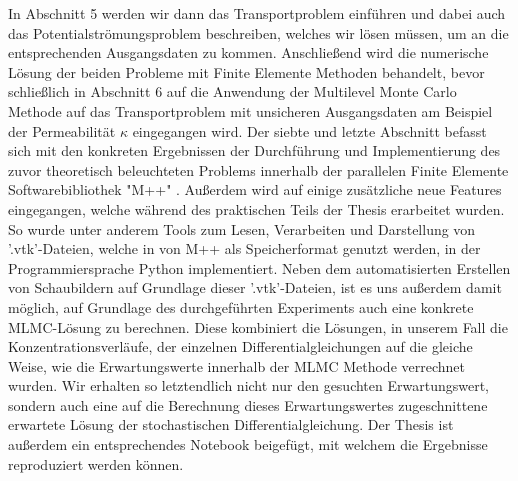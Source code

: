 In Abschnitt 5 werden wir dann das Transportproblem einführen und dabei auch das Potentialströmungsproblem beschreiben, welches wir lösen müssen, um an die entsprechenden Ausgangsdaten zu kommen. Anschließend wird die numerische Lösung der beiden Probleme mit Finite Elemente Methoden behandelt, bevor schließlich in Abschnitt 6 auf die Anwendung der Multilevel Monte Carlo Methode auf das Transportproblem mit unsicheren Ausgangsdaten am Beispiel der Permeabilität $\kappa$ eingegangen wird. 
Der siebte und letzte Abschnitt befasst sich mit den konkreten Ergebnissen der Durchführung und Implementierung des zuvor theoretisch beleuchteten Problems innerhalb der parallelen Finite Elemente Softwarebibliothek "M++" \cite{siteM++}. Außerdem wird auf einige zusätzliche neue Features eingegangen, welche während des praktischen Teils der Thesis erarbeitet wurden. So wurde unter anderem Tools zum Lesen, Verarbeiten und Darstellung von '.vtk'-Dateien, welche in von M++ als Speicherformat genutzt werden, in der Programmiersprache Python implementiert. Neben dem automatisierten Erstellen von Schaubildern auf Grundlage dieser '.vtk'-Dateien, ist es uns außerdem damit möglich, auf Grundlage des durchgeführten Experiments auch eine konkrete MLMC-Lösung zu berechnen. Diese kombiniert die Lösungen, in unserem Fall die Konzentrations\-verläufe, der einzelnen Differentialgleichungen auf die gleiche Weise, wie die Erwartungswerte innerhalb der MLMC Methode verrechnet wurden. Wir erhalten so letztendlich nicht nur den gesuchten Erwartungswert, sondern auch eine auf die Berechnung dieses Erwartungswertes zugeschnittene erwartete Lösung der stochastischen Differentialgleichung. 
Der Thesis ist außerdem ein entsprechendes Notebook beigefügt, mit welchem die Ergebnisse reproduziert werden können.